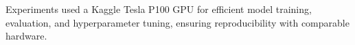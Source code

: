 Experiments used a Kaggle Tesla P100 GPU for efficient model training, evaluation, and hyperparameter tuning, ensuring reproducibility with comparable hardware.




